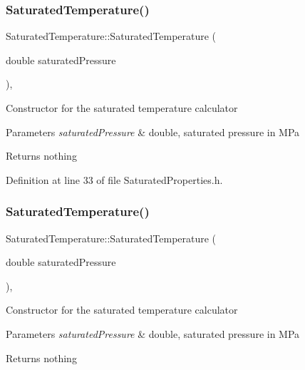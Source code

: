 \subsubsection{\texorpdfstring{Saturated\+Temperature()}{SaturatedTemperature()}\hspace{0.1cm}{\footnotesize\ttfamily [1/3]}}
{\footnotesize\ttfamily Saturated\+Temperature\+::\+Saturated\+Temperature (\begin{DoxyParamCaption}\item[{double}]{saturated\+Pressure }\end{DoxyParamCaption})\hspace{0.3cm}{\ttfamily [inline]}, {\ttfamily [explicit]}}

Constructor for the saturated temperature calculator


\begin{DoxyParams}{Parameters}
{\em saturated\+Pressure} & double, saturated pressure in M\+Pa\\
\hline
\end{DoxyParams}
\begin{DoxyReturn}{Returns}
nothing 
\end{DoxyReturn}


Definition at line 33 of file Saturated\+Properties.\+h.

\mbox{\label{class_saturated_temperature_ae0a4b1684a756ac8f91d3ebb646d6865}} 
\subsubsection{\texorpdfstring{Saturated\+Temperature()}{SaturatedTemperature()}\hspace{0.1cm}{\footnotesize\ttfamily [2/3]}}
{\footnotesize\ttfamily Saturated\+Temperature\+::\+Saturated\+Temperature (\begin{DoxyParamCaption}\item[{double}]{saturated\+Pressure }\end{DoxyParamCaption})\hspace{0.3cm}{\ttfamily [inline]}, {\ttfamily [explicit]}}

Constructor for the saturated temperature calculator


\begin{DoxyParams}{Parameters}
{\em saturated\+Pressure} & double, saturated pressure in M\+Pa\\
\hline
\end{DoxyParams}
\begin{DoxyReturn}{Returns}
nothing 
\end{DoxyReturn}


